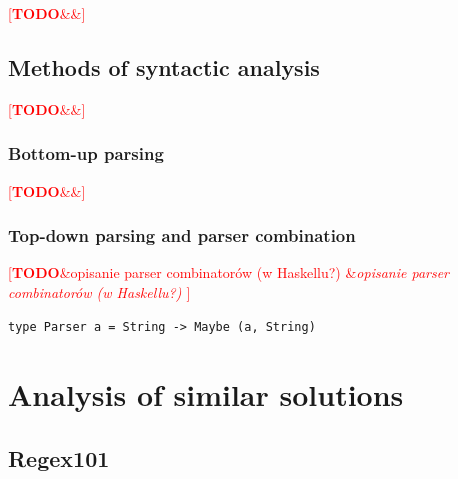\documentclass[english,engineering]{wizthesis}
\newcommand{\todo}[1]{%
  \textcolor{red}{[\textbf{TODO}\ifx&#1&{}\else{ }\fi\emph{#1}]}%
}
\begin{document}
\todo{}

\section{Methods of syntactic analysis} \label{sec:parsing}

\todo{\cite{aho-2019}}

\subsection{Bottom-up parsing}

\todo{}

\subsection{Top-down parsing and parser combination}

\todo{opisanie parser combinatorów (w Haskellu?) \cite{swierstra-2009}
\cite{leijen-2001} \cite{fokker-1995}}

\begin{verbatim}
type Parser a = String -> Maybe (a, String)
\end{verbatim}




\chapter{Analysis of similar solutions}

\section*{Regex101}
\end{document}
